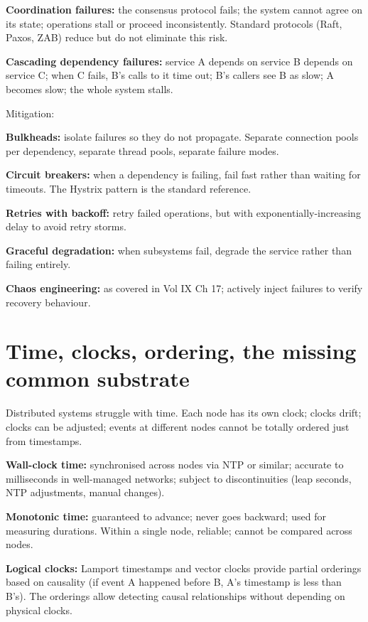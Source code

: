 \textbf{Coordination failures:} the consensus protocol fails; the system cannot agree on its state; operations stall or proceed inconsistently. Standard protocols (Raft, Paxos, ZAB) reduce but do not eliminate this risk.

\textbf{Cascading dependency failures:} service A depends on service B depends on service C; when C fails, B's calls to it time out; B's callers see B as slow; A becomes slow; the whole system stalls.

Mitigation:

\textbf{Bulkheads:} isolate failures so they do not propagate. Separate connection pools per dependency, separate thread pools, separate failure modes.

\textbf{Circuit breakers:} when a dependency is failing, fail fast rather than waiting for timeouts. The Hystrix pattern is the standard reference.

\textbf{Retries with backoff:} retry failed operations, but with exponentially-increasing delay to avoid retry storms.

\textbf{Graceful degradation:} when subsystems fail, degrade the service rather than failing entirely.

\textbf{Chaos engineering:} as covered in Vol IX Ch 17; actively inject failures to verify recovery behaviour.

\section{Time, clocks, ordering, the missing common substrate}

Distributed systems struggle with time. Each node has its own clock; clocks drift; clocks can be adjusted; events at different nodes cannot be totally ordered just from timestamps.

\textbf{Wall-clock time:} synchronised across nodes via NTP or similar; accurate to milliseconds in well-managed networks; subject to discontinuities (leap seconds, NTP adjustments, manual changes).

\textbf{Monotonic time:} guaranteed to advance; never goes backward; used for measuring durations. Within a single node, reliable; cannot be compared across nodes.

\textbf{Logical clocks:} Lamport timestamps and vector clocks provide partial orderings based on causality (if event A happened before B, A's timestamp is less than B's). The orderings allow detecting causal relationships without depending on physical clocks.

